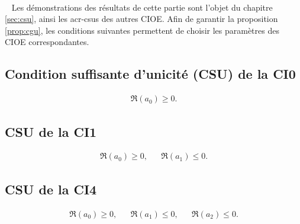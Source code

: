   {~}\\{~}
  Les démonstrations des résultats de cette partie sont l'objet du chapitre \ref{sec:csu}, ainsi les \glspl{acr-csu} des autres CIOE.
  Afin de garantir la proposition \ref{prop:cgu}, les conditions suivantes permettent de choisir les paramètres des CIOE correspondantes.

  \subsection{Condition suffisante d'unicité (CSU) de la CI0}
    \begin{align*}
      \Re(a_0) \ge 0.
    \end{align*}
  
  \subsection{CSU de la CI1}
    \begin{align*}
      \Re(a_0) \ge 0,&& \Re(a_1) \le 0.
    \end{align*}

  \subsection{CSU de la CI4}
    \begin{align*}
      \Re(a_0) \ge 0,&& \Re(a_1) \le 0,&& \Re(a_2) \le 0.
    \end{align*}
